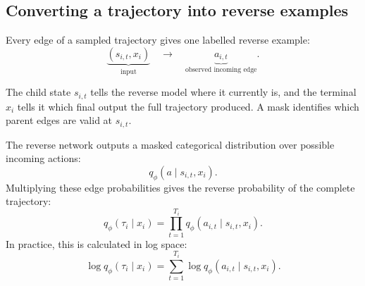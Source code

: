 \documentclass[11pt]{article}
\newcommand{\qphi}{q_\phi}
\begin{document}
\subsection{Converting a trajectory into reverse examples}

Every edge of a sampled trajectory gives one labelled reverse example:
\begin{equation}
    \underbrace{(s_{i,t},x_i)}_{\text{input}}
    \quad\longrightarrow\quad
    \underbrace{a_{i,t}}_{\text{observed incoming edge}}.
    \label{eq:edge-example}
\end{equation}

The child state \(s_{i,t}\) tells the reverse model where it currently is, and the terminal \(x_i\) tells it which final output the full trajectory produced. A mask identifies which parent edges are valid at \(s_{i,t}\).

The reverse network outputs a masked categorical distribution over possible incoming actions:
\begin{equation}
    \qphi(a\mid s_{i,t},x_i).
\end{equation}
Multiplying these edge probabilities gives the reverse probability of the complete trajectory:
\begin{equation}
    \qphi(\tau_i\mid x_i)
    =
    \prod_{t=1}^{T_i}
    \qphi(a_{i,t}\mid s_{i,t},x_i).
    \label{eq:q-path-product}
\end{equation}
In practice, this is calculated in log space:
\begin{equation}
    \log \qphi(\tau_i\mid x_i)
    =
    \sum_{t=1}^{T_i}
    \log \qphi(a_{i,t}\mid s_{i,t},x_i).
    \label{eq:q-path-log}
\end{equation}
\end{document}
